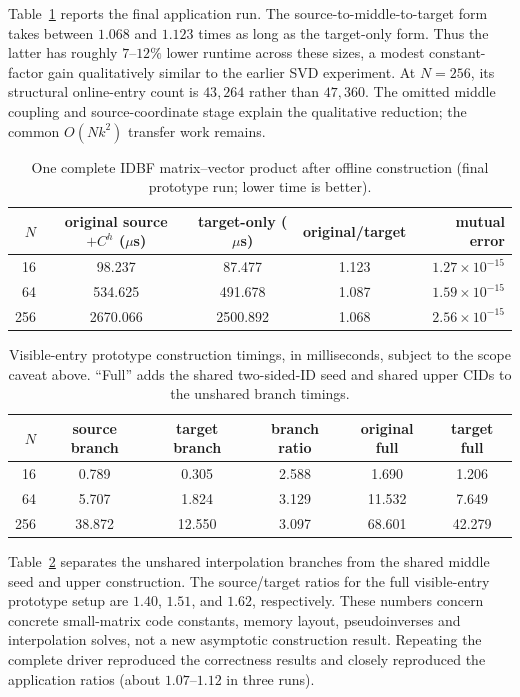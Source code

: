 \documentclass[11pt]{article}
\begin{document}
Table~\ref{tab:idbf-app} reports the final application run.  The source-to-middle-to-target form takes between $1.068$ and $1.123$ times as long as the target-only form.  Thus the latter has roughly $7$--$12\%$ lower runtime across these sizes, a modest constant-factor gain qualitatively similar to the earlier SVD experiment.  At $N=256$, its structural online-entry count is $43{,}264$ rather than $47{,}360$.  The omitted middle coupling and source-coordinate stage explain the qualitative reduction; the common $O(Nk^2)$ transfer work remains.

\begin{table}[htbp]
\centering
\caption{One complete IDBF matrix--vector product after offline construction (final prototype run; lower time is better).}
\label{tab:idbf-app}
\begin{tabular}{rcccr}
\toprule
$N$ & original source $+C^h$ ($\mu$s) & target-only ($\mu$s) & original/target & mutual error\\
\midrule
16  &   98.237 &   87.477 & 1.123 & $1.27\times10^{-15}$\\
64  &  534.625 &  491.678 & 1.087 & $1.59\times10^{-15}$\\
256 & 2670.066 & 2500.892 & 1.068 & $2.56\times10^{-15}$\\
\bottomrule
\end{tabular}
\end{table}

\begin{table}[htbp]
\centering
\caption{Visible-entry prototype construction timings, in milliseconds, subject to the scope caveat above.  ``Full'' adds the shared two-sided-ID seed and shared upper CIDs to the unshared branch timings.}
\label{tab:idbf-build}
\small
\setlength{\tabcolsep}{4.2pt}
\begin{tabular}{rccccc}
\toprule
$N$ & source branch & target branch & branch ratio & original full & target full\\
\midrule
16  &  0.789 &  0.305 & 2.588 &  1.690 &  1.206\\
64  &  5.707 &  1.824 & 3.129 & 11.532 &  7.649\\
256 & 38.872 & 12.550 & 3.097 & 68.601 & 42.279\\
\bottomrule
\end{tabular}
\end{table}

Table~\ref{tab:idbf-build} separates the unshared interpolation branches from the shared middle seed and upper construction.  The source/target ratios for the full visible-entry prototype setup are $1.40$, $1.51$, and $1.62$, respectively.  These numbers concern concrete small-matrix code constants, memory layout, pseudoinverses and interpolation solves, not a new asymptotic construction result.  Repeating the complete driver reproduced the correctness results and closely reproduced the application ratios (about $1.07$--$1.12$ in three runs).
\end{document}
